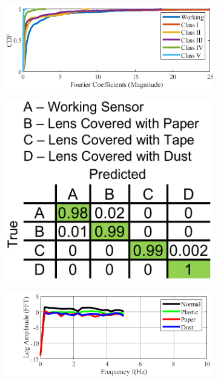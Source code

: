 \documentclass[manuscript,screen,review]{acmart} %
\providecommand{\DIFdelbegin}{} %
\providecommand{\DIFaddbeginFL}{} %
\providecommand{\DIFaddendFL}{} %
\providecommand{\DIFdelendFL}{} %
\newcommand{\DIFscaledelfig}{0.5}
\newlength{\DIFdelgraphicswidth} %
\newlength{\DIFdelgraphicsheight} %
\newcommand{\DIFaddincludegraphics}[2][]{{\color{blue}\fbox{\DIFOincludegraphics[#1]{#2}}}} %
\newcommand{\DIFdelincludegraphics}[2][]{%
\sbox{\DIFdelgraphicsbox}{\DIFOincludegraphics[#1]{#2}}%
\settoboxwidth{\DIFdelgraphicswidth}{\DIFdelgraphicsbox} %
\settoboxtotalheight{\DIFdelgraphicsheight}{\DIFdelgraphicsbox} %
\scalebox{\DIFscaledelfig}{%
\parbox[b]{\DIFdelgraphicswidth}{\usebox{\DIFdelgraphicsbox}\\[-\baselineskip] \rule{\DIFdelgraphicswidth}{0em}}\llap{\resizebox{\DIFdelgraphicswidth}{\DIFdelgraphicsheight}{%
\setlength{\unitlength}{\DIFdelgraphicswidth}%
\begin{picture}(1,1)%
\thicklines\linethickness{2pt} %
{\color[rgb]{1,0,0}\put(0,0){\framebox(1,1){}}}%
{\color[rgb]{1,0,0}\put(0,0){\line( 1,1){1}}}%
{\color[rgb]{1,0,0}\put(0,1){\line(1,-1){1}}}%
\end{picture}%
}\hspace*{3pt}}} %
} %
\DeclareRobustCommand{\DIFdelbegin}{\DIFOdelbegin \let\includegraphics\DIFdelincludegraphics} %
\DeclareRobustCommand{\DIFaddbeginFL}{\DIFOaddbeginFL \let\includegraphics\DIFaddincludegraphics} %
\DeclareRobustCommand{\DIFaddendFL}{\DIFOaddendFL \let\includegraphics\DIFOincludegraphics} %
\DeclareRobustCommand{\DIFdelendFL}{\DIFOaddendFL \let\includegraphics\DIFOincludegraphics} %
\begin{document}
\DIFdelbegin %
\DIFdelendFL \DIFaddbeginFL \begin{figure}\DIFaddendFL \begin{subfigure}[t]{0.41\textwidth}
\includegraphics[width=\linewidth]{figures/2-PIR-Fault/all-5-combined/CDF_FFT.png}
		\caption{}
		\label{fig:cdf_combined_all}
	\end{subfigure}\hfill \begin{subfigure}[b]{0.16\textwidth}
		\centering
		\includegraphics[width=\linewidth]{figures/classification/LensDefects/confusion-matrix-lensdefects.png}
		\caption{}
		\label{fig:finegrained_classification_results}
	\end{subfigure}\begin{subfigure}[t]{0.41\textwidth}
		\centering
\includegraphics[width=\linewidth]{figures/classification/LensDefects/Log_Aout_Paper_Plastic_Dust_Normal.png}

\end{subfigure}
\end{figure}
\end{document}
